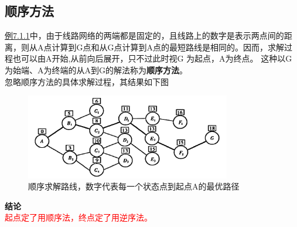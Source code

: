 \subsection{顺序方法}
\hyperref[eg:7.1.1]{例7.1.1}中，由于线路网络的两端都是固定的，且线路上的数字是表示两点间的距离，则从A点计算到G点和从G点计算到A点的最短路线是相同的。因而，求解过程也可以由A开始,从前向后展开，只不过此时视G 为起点，A为终点。
这种以G为始端、A为终端的从A到G的解法称为\textbf{顺序方法}。\\
忽略顺序方法的具体求解过程，其结果如下图
\begin{figure}[H]
	\centering
	\includegraphics[width=0.8\textwidth]{./image/32.png}
	\caption{顺序求解路线，数字代表每一个状态点到起点A的最优路径}
	\label{fig:Chapter4_Temporary_Pavilion_1}
\end{figure}

\begin{notebox}{\textbf{结论}}{}
	\\\textcolor{red}{起点定了用顺序法，终点定了用逆序法。}
\end{notebox}
